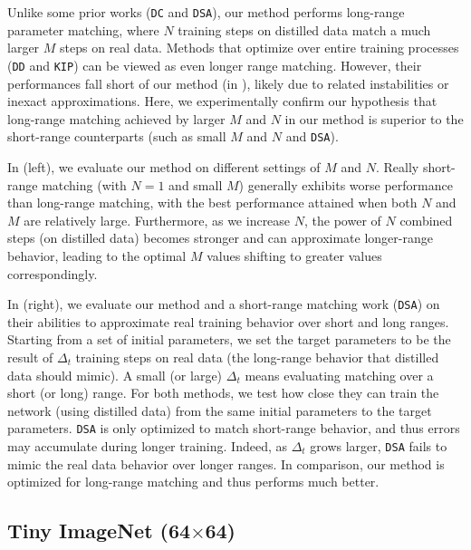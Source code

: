 Unlike some prior works (\texttt{DC} and \texttt{DSA}), our method performs long-range parameter matching, where $N$ training steps on distilled data match a much larger $M$ steps on real data. Methods that optimize over entire training processes (\eg \texttt{DD} and \texttt{KIP}) can be viewed as even longer range matching. However, their performances fall short of our method (\eg in ), likely due to related instabilities or inexact approximations. Here, we experimentally confirm our hypothesis that long-range matching achieved by larger $M$ and $N$ in our method is superior to the short-range counterparts (such as small $M$ and $N$ and \texttt{DSA}).


In  (left), we evaluate our method on different settings of $M$ and $N$. Really short-range matching (with $N=1$ and small $M$) generally exhibits worse performance than long-range matching, with the best performance attained when both $N$ and $M$ are relatively large. Furthermore, as we increase $N$, the power of  $N$ combined steps (on distilled data) becomes stronger and can approximate longer-range behavior, leading to the optimal $M$ values shifting to greater values correspondingly.



In   (right), we evaluate our method and a short-range matching work (\texttt{DSA}) on their abilities to approximate real training behavior over short and long ranges. Starting from a set of initial parameters, we set the target parameters to be the result of $\Delta_t$ training steps on real data (\ie the long-range behavior that distilled data should mimic). A small (or large) $\Delta_t$ means evaluating matching over a short (or long) range. For both methods, we test how close they can train the network (using distilled data) from the same initial parameters to the target parameters. \texttt{DSA} is only optimized to match short-range behavior, and thus errors may accumulate during longer training. Indeed, as $\Delta_t$ grows larger, \texttt{DSA} fails to mimic the real data behavior over longer ranges. In comparison, our method is optimized for long-range matching and thus performs much better.








\subsection{Tiny ImageNet (64$\times$64)}

